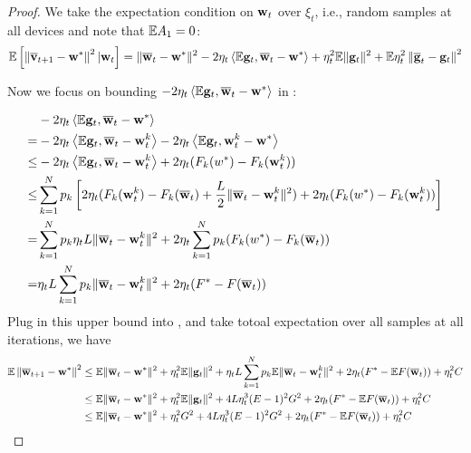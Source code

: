 \begin{proof}
We take the expectation condition on ${\mathbf{w}}_t$ over $\xi_t$, i.e., random samples at all devices and
note that $\mathbb{E} A_1 = 0$:
\begin{align}
\mathbb{E}\left[\left\|{\overline{\mathbf{v}}}_{t+1}-{\mathbf{w}}^{*}\right\|^2| {\mathbf{w}}_{t}\right]=\|{\overline{\mathbf{w}}}_{t}-{\mathbf{w}}^{*}\|^{2}-2 \eta_{t} \left<\mathbb{E} {\mathbf{g}}_{t}, {\overline{\mathbf{w}}}_{t}-{\mathbf{w}}^{*} \right> +\eta_{t}^{2} \mathbb{E}\| {\mathbf{g}}_{t} \|^{2} + \mathbb{E} \eta_{t}^2\left\| {\overline{\mathbf{g}}}_t -  {\mathbf{g}}_{t}\right\|^2
\label{eq:expandsgd}
\end{align}

Now we focus on bounding $-2 \eta_{t} \left< \mathbb{E} {\mathbf{g}}_{t}, {\overline{\mathbf{w}}}_{t}-{\mathbf{w}}^{*}\right>$ in \eq{\ref{eq:expandsgd}}: 

\begin{align*}
	& -2 \eta_{t} \left<\mathbb{E} {\mathbf{g}}_{t}, {\overline{\mathbf{w}}}_{t}-{\mathbf{w}}^{*}\right> \\
 =  & -2 \eta_{t} \left<\mathbb{E} {\mathbf{g}}_{t}, {\overline{\mathbf{w}}}_{t}- {\mathbf{w}}^{k}_t \right> -2 \eta_{t} \left<\mathbb{E} {\mathbf{g}}_{t}, {\mathbf{w}}^{k}_t - {\mathbf{w}}^{*}\right>\\
 \leq & -2 \eta_{t} \left<\mathbb{E} {\mathbf{g}}_{t}, {\overline{\mathbf{w}}}_{t}- {\mathbf{w}}^{k}_t \right> + 2 \eta_{t} (F_k(w^*) - F_k({\mathbf{w}}^{k}_t))\\
 \leq &\sum_{k=1}^N p_k \left[2 \eta_{t} (F_k({\mathbf{w}}^{k}_t) - F_k({\overline{\mathbf{w}}}_t) + \frac{L}{2} \|{\overline{\mathbf{w}}}_t - {\mathbf{w}}^{k}_t\|^2 ) + 2 \eta_{t} (F_k(w^*) - F_k({\mathbf{w}}^{k}_t))\right]\\
 = & \sum_{k=1}^N p_k \eta_t L \|{\overline{\mathbf{w}}}_t - {\mathbf{w}}^{k}_t\|^2 + 2 \eta_{t} \sum_{k=1}^N p_k (F_k(w^*) - F_k({\overline{\mathbf{w}}}_t))\\
 = &  \eta_t L \sum_{k=1}^N p_k \|{\overline{\mathbf{w}}}_t - {\mathbf{w}}^{k}_t\|^2 + 2 \eta_{t} (F^* - F({\overline{\mathbf{w}}}_t))
\end{align*}
Plug in this upper bound into \eq{\ref{eq:expandsgd}}, \eq{\ref{eq:sgdcvxsmth1}} and take totoal expectation over all samples at all iterations, we have
\begin{align}
\mathbb{E}\left\|{\overline{\mathbf{w}}}_{t+1}-{\mathbf{w}}^{*}\right\|^2 &\leq \mathbb{E}\|{\overline{\mathbf{w}}}_{t}-{\mathbf{w}}^{*}\|^{2}+\eta_{t}^{2} \mathbb{E}\| {\mathbf{g}}_{t} \|^{2} + \eta_t L \sum_{k=1}^N p_k \mathbb{E} \|{\overline{\mathbf{w}}}_t - {\mathbf{w}}^{k}_t\|^2 + 2 \eta_{t} (F^* - \mathbb{E} F({\overline{\mathbf{w}}}_t)) + \eta_t^2 C\\
&\leq\mathbb{E} \|{\overline{\mathbf{w}}}_{t}-{\mathbf{w}}^{*}\|^{2}+\eta_{t}^{2} \mathbb{E}\| {\mathbf{g}}_{t} \|^{2} +  4L\eta_t^3(E-1)^2 G^2 + 2 \eta_{t} (F^* - \mathbb{E} F({\overline{\mathbf{w}}}_t)) + \eta_t^2 C\\
&\leq \mathbb{E}\|{\overline{\mathbf{w}}}_{t}-{\mathbf{w}}^{*}\|^{2}+\eta_{t}^{2} G^2 +  4L\eta_t^3(E-1)^2 G^2 + 2 \eta_{t} (F^* - \mathbb{E} F({\overline{\mathbf{w}}}_t))+\eta_t^2 C \label{eq:cvxsgd1}
\end{align}


\end{proof}
